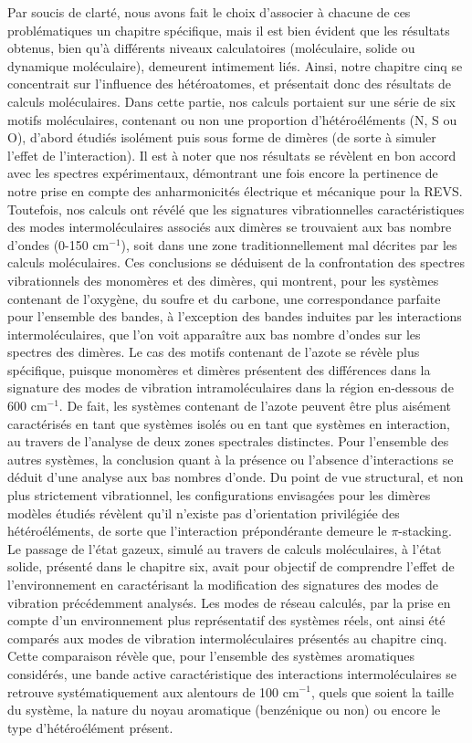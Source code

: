 	Par soucis de clarté, nous avons fait le choix d'associer à chacune de ces problématiques un chapitre spécifique, mais il est bien évident que les résultats obtenus, bien qu'à différents niveaux calculatoires (moléculaire, solide ou dynamique moléculaire), demeurent intimement liés. 
	Ainsi, notre chapitre cinq se concentrait sur l'influence des hétéroatomes, et présentait donc des résultats de calculs moléculaires. Dans cette partie, nos calculs portaient sur une série de six motifs moléculaires, contenant ou non une proportion d'hétéroéléments (N, S ou O), d'abord étudiés isolément puis sous forme de dimères (de sorte à simuler l'effet de l'interaction). Il est à noter que nos résultats se révèlent en bon accord avec les spectres expérimentaux, démontrant une fois encore la pertinence de notre prise en compte des anharmonicités électrique et mécanique pour la REVS. Toutefois, nos calculs ont révélé que les signatures vibrationnelles caractéristiques des modes intermoléculaires associés aux dimères se trouvaient aux bas nombre d'ondes (0-150 cm$^{-1}$), soit dans une zone traditionnellement mal décrites par les calculs moléculaires. Ces conclusions se déduisent de la confrontation des spectres vibrationnels des monomères et des dimères, qui montrent, pour les systèmes contenant de l'oxygène, du soufre et du carbone, une correspondance parfaite pour l'ensemble des bandes, à l'exception des bandes induites par les interactions intermoléculaires, que l'on voit apparaître aux bas nombre d'ondes sur les spectres des dimères. Le cas des motifs contenant de l'azote se révèle plus spécifique, puisque monomères et dimères présentent des différences dans la signature des modes de vibration intramoléculaires dans la région en-dessous de 600 cm$^{-1}$. De fait, les systèmes contenant de l'azote peuvent être plus aisément caractérisés en tant que systèmes isolés ou en tant que systèmes en interaction, au travers de l'analyse de deux zones spectrales distinctes. Pour l'ensemble des autres systèmes, la conclusion quant à la présence ou l'absence d'interactions se déduit d'une analyse aux bas nombres d'onde. 	
Du point de vue structural, et non plus strictement vibrationnel, les configurations envisagées pour les dimères modèles étudiés révèlent qu'il n'existe pas d'orientation privilégiée des hétéroéléments, de sorte que l'interaction prépondérante demeure le $\pi$-stacking.\\ 	

	
	Le passage de l'état gazeux, simulé au travers de calculs moléculaires, à l'état solide, présenté dans le chapitre six, avait pour objectif de comprendre l'effet de l'environnement en caractérisant la modification des signatures des modes de vibration précédemment analysés. Les modes de réseau calculés, par la prise en compte d'un environnement plus représentatif des systèmes réels, ont ainsi été comparés aux modes de vibration intermoléculaires présentés au chapitre cinq. Cette comparaison révèle que, pour l'ensemble des systèmes aromatiques considérés, une bande active caractéristique des interactions intermoléculaires se retrouve systématiquement aux alentours de 100 cm$^{-1}$, quels que soient la taille du système, la nature du noyau aromatique (benzénique ou non) ou encore le type d'hétéroélément présent.\\ 

